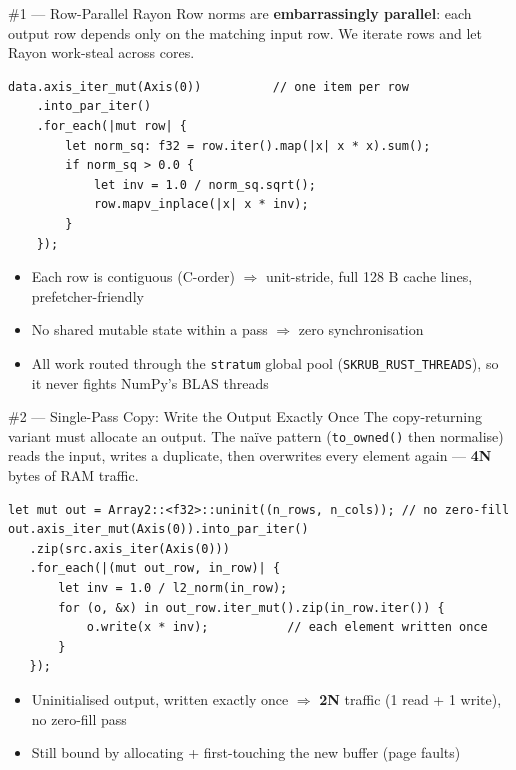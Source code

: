 \documentclass[aspectratio=169]{beamer}
\begin{document}
\begin{frame}[fragile]{\#1 — Row-Parallel Rayon}
  Row norms are \textbf{embarrassingly parallel}: each output row depends only on
  the matching input row. We iterate rows and let Rayon work-steal across cores.
\begin{lstlisting}
data.axis_iter_mut(Axis(0))          // one item per row
    .into_par_iter()
    .for_each(|mut row| {
        let norm_sq: f32 = row.iter().map(|x| x * x).sum();
        if norm_sq > 0.0 {
            let inv = 1.0 / norm_sq.sqrt();
            row.mapv_inplace(|x| x * inv);
        }
    });
\end{lstlisting}
  \begin{itemize}
    \item Each row is contiguous (C-order) $\Rightarrow$ unit-stride, full 128 B
          cache lines, prefetcher-friendly
    \item No shared mutable state within a pass $\Rightarrow$ zero synchronisation
    \item All work routed through the \texttt{stratum} global pool
          (\texttt{SKRUB\_RUST\_THREADS}), so it never fights NumPy's BLAS threads
  \end{itemize}
\end{frame}

\begin{frame}[fragile]{\#2 — Single-Pass Copy: Write the Output Exactly Once}
  The copy-returning variant must allocate an output. The naïve pattern
  (\texttt{to\_owned()} then normalise) reads the input, writes a duplicate, then
  overwrites every element again --- \textbf{4N} bytes of RAM traffic.
\begin{lstlisting}
let mut out = Array2::<f32>::uninit((n_rows, n_cols)); // no zero-fill
out.axis_iter_mut(Axis(0)).into_par_iter()
   .zip(src.axis_iter(Axis(0)))
   .for_each(|(mut out_row, in_row)| {
       let inv = 1.0 / l2_norm(in_row);
       for (o, &x) in out_row.iter_mut().zip(in_row.iter()) {
           o.write(x * inv);           // each element written once
       }
   });
\end{lstlisting}
  \begin{itemize}
    \item Uninitialised output, written exactly once $\Rightarrow$ \textbf{2N} traffic
          (1 read + 1 write), no zero-fill pass
    \item Still bound by allocating + first-touching the new buffer (page faults)
  \end{itemize}
\end{frame}
\end{document}
